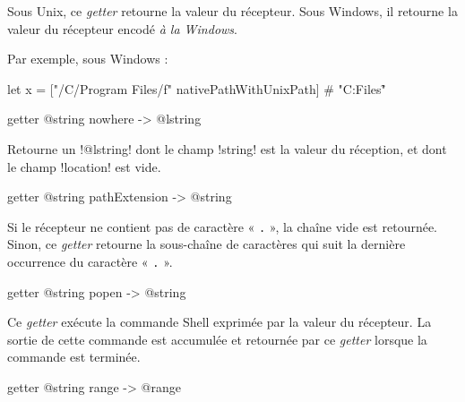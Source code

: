 Sous Unix, ce \emph{getter} retourne la valeur du récepteur. Sous Windows, il retourne la valeur du récepteur encodé \emph{à la Windows}.

Par exemple, sous Windows :
\begin{galgas3}
let x = ["/C/Program Files/f" nativePathWithUnixPath] # "C:\Program Files\f"
\end{galgas3}








\begin{galgas3box}
getter @string nowhere -> @lstring
\end{galgas3box}

Retourne un \ggst!@lstring! dont le champ \ggst!string! est la valeur du réception, et dont le champ \ggst!location! est vide.








\begin{galgas3box}
getter @string pathExtension -> @string
\end{galgas3box}

Si le récepteur ne contient pas de caractère « \texttt{.} », la chaîne vide est retournée. Sinon, ce \emph{getter} retourne la sous-chaîne de caractères qui suit la dernière occurrence du caractère « \texttt{.} ».









\begin{galgas3box}
getter @string popen -> @string
\end{galgas3box}

Ce \emph{getter} exécute la commande Shell exprimée par la valeur du récepteur. La sortie de cette commande est accumulée et retournée par ce \emph{getter} lorsque la commande est terminée.









\begin{galgas3box}
getter @string range -> @range
\end{galgas3box}

